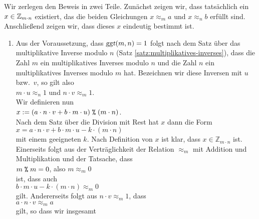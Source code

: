 \proof
Wir zerlegen den Beweis in zwei Teile.  
Zunächst zeigen wir, dass tatsächlich ein $x \in \mathbb{Z}_{m \cdot n}$ existiert, das die beiden
Gleichungen $x \approx_m a$ und  $x \approx_n b$ erfüllt sind.  Anschließend zeigen wir,
dass dieses $x$ eindeutig bestimmt ist.
\begin{enumerate}
\item Aus der Voraussetzung,
      dass $\textsl{ggt}(m,n) = 1$ folgt nach dem Satz über das multiplikative Inverse modulo
      $n$ (Satz \ref{satz:multiplikatives-inverses}), dass die Zahl $m$ ein multiplikatives
      Inverses modulo $n$ und die Zahl $n$ ein multiplikatives
      Inverses modulo $m$ hat.  Bezeichnen wir diese Inversen mit $u$ bzw.~$v$, so gilt also
      \\[0.2cm]
      \hspace*{1.3cm}
      $m \cdot u \approx_n 1$ \quad und \quad $n \cdot v \approx_m 1$.
      \\[0.2cm]
      Wir definieren nun
      \\[0.2cm]
      \hspace*{1.3cm}
      $x := (a \cdot n \cdot v + b \cdot m \cdot u) \;\texttt{\%}\; (m \cdot n)$.
      \\[0.2cm]
      Nach dem Satz über die Division mit Rest hat $x$ dann die Form
      \\[0.2cm]
      \hspace*{1.3cm}
      $x = a \cdot n \cdot v + b \cdot m \cdot u - k \cdot (m \cdot n)$
      \\[0.2cm]
      mit einem geeigneten $k$.  Nach Definition von $x$ ist klar, dass 
      $x \in \mathbb{Z}_{m \cdot n}$ ist.  Einerseits folgt aus der Verträglichkeit der Relation
      $\approx_m$ mit Addition und Multiplikation und der Tatsache, dass
      \\[0.2cm]
      \hspace*{1.3cm}
      $m \;\texttt{\%}\; m = 0$, \quad also $m \approx_m 0$
      \\[0.2cm]
      ist, dass auch
      \\[0.2cm]
      \hspace*{1.3cm}
      $b \cdot m \cdot u - k \cdot (m \cdot n) \approx_m 0$
      \\[0.2cm]
      gilt.  Andererseits folgt aus $n \cdot v \approx_m  1$, dass
      \\[0.2cm]
      \hspace*{1.3cm}
      $a \cdot n \cdot v \approx_m a$ 
      \\[0.2cm]
      gilt, so dass wir insgesamt

\end{enumerate}
